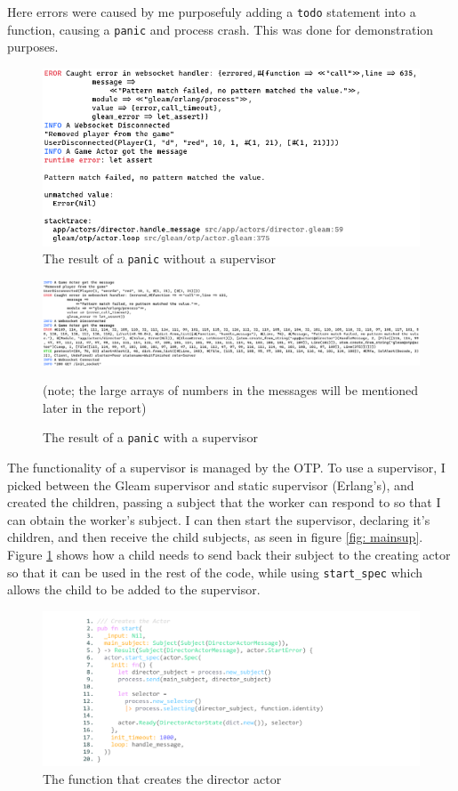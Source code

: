 \documentclass[]{final}
\begin{document}
Here errors were caused by me purposefuly adding a \lstinline|todo| statement
into a function, causing a \lstinline|panic| and process crash. This was done
for demonstration purposes.

\label{ascii}

\begin{figure}[H]
  \centering
  \includegraphics[width=.5\linewidth]{panic_without_supervisor.png}
  \caption{The result of a \lstinline|panic| without a supervisor}
\end{figure}

\begin{figure}[H]
  \centering
  \includegraphics[width=\linewidth]{panic_with_supervisor.png}
  \caption{The result of a \lstinline|panic| with a supervisor}
  (note; the large arrays of numbers in the messages will be mentioned later in
  the report)
\end{figure}

The functionality of a supervisor is managed by the OTP. To use a supervisor,
I picked between the Gleam supervisor and static supervisor (Erlang's),
and created the children, passing a subject that the worker can respond to
so that I can obtain the worker's subject. I can then start the supervisor,
declaring it's children, and then receive the child subjects, as seen in
figure \ref{fig: mainsup}. Figure \ref{fig: dirstart} shows how a child
needs to send back their subject to the creating actor so that it can be used
in the rest of the code, while using \lstinline|start_spec| which allows the
child to be added to the supervisor.

\begin{figure}[H]
  \centering
  \includegraphics[width=\textwidth]{director_start.pdf}
  \caption{The function that creates the director actor}\label{fig: dirstart}
\end{figure}
\end{document}
